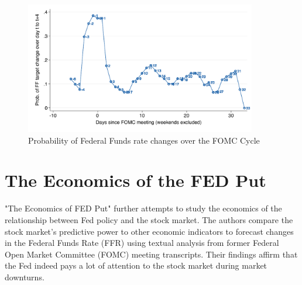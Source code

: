 \begin{figure}[h]
    \centering
    \includegraphics[width=0.9\textwidth]{figures/cies19/fig3A}
    \caption{Probability of Federal Funds rate changes over the FOMC Cycle \parencite{cieslak_stock_2019} }
\end{figure}

\pagebreak

\section{The Economics of the FED Put}
"The Economics of FED Put" further attempts to study the economics of the relationship between Fed policy and the stock market. The authors compare the stock market's predictive power to other economic indicators to forecast changes in the Federal Funds Rate (FFR) using textual analysis from former Federal Open Market Committee (FOMC) meeting transcripts. Their findings affirm that the Fed indeed pays a lot of attention to the stock market during market downturns.

